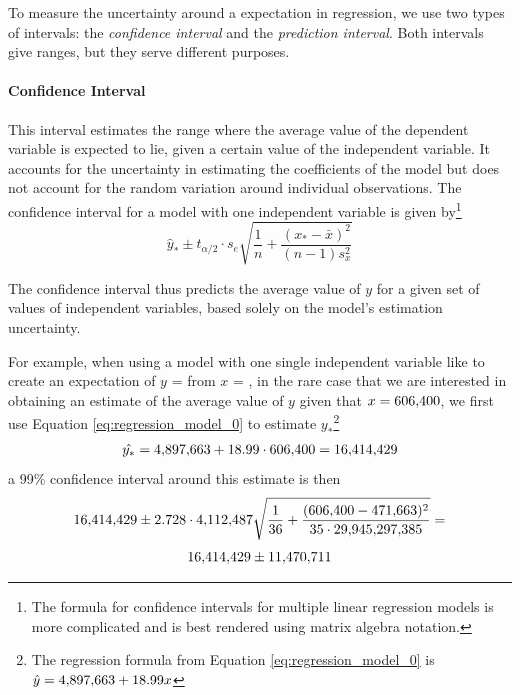 To measure the uncertainty around a expectation in regression, we use two types of intervals: the \emph{confidence interval} and the \emph{prediction interval}. Both intervals give ranges, but they serve different purposes.

\paragraph{Confidence Interval} This interval estimates the range where the average value of the dependent variable is expected to lie, given a certain value of the independent variable. It accounts for the uncertainty in estimating the coefficients of the model but does not account for the random variation around individual observations. 
The confidence interval for a model with one independent variable is given by\footnote{The formula for confidence intervals for multiple linear regression models is more complicated and is best rendered using matrix algebra notation.}
\begin{equation}
\hat{y}_* \pm t_{\alpha / 2} \cdot s_e \sqrt{\frac{1}{n} + \frac{(x_* - \bar{x})^2}{(n - 1) s_x^2}}
\end{equation}

The confidence interval thus predicts the average value of $y$ for a given set of values of independent variables, based solely on the model's estimation uncertainty.

For example, when using a model with one single independent variable like  to create an expectation of $y$ =  from $x$ = , in the rare case that we are interested in obtaining an estimate of the average value of $y$ given that $x = \RegModZeroXStar$, we first use Equation \ref{eq:regression_model_0} to estimate $y_*$\footnote{The regression formula from Equation \ref{eq:regression_model_0} is $\hat{y} = \RegModZeroIntercept + \RegModZeroSlope x$}
\begin{equation*}
  \hat{y_*} = \RegModZeroIntercept + \RegModZeroSlope \cdot \RegModZeroXStar = \RegModZeroYHat
\end{equation*}
a 99\% confidence interval around this estimate is then
\begin{equation*}
  \RegModZeroYHat \pm \RegModZeroTCritNinetyNine \cdot \RegModZeroResidualSd \sqrt{\frac{1}{\RegModZeroSampleSize} + \frac{(\RegModZeroXStar - \RegModZeroXMean)^2}{\RegModZeroDf \cdot \RegModZeroSxx}} =
\end{equation*}
\begin{equation*}
\RegModZeroYHat \pm \RegModZeroPrecisionCritNinetyNine
\end{equation*}

